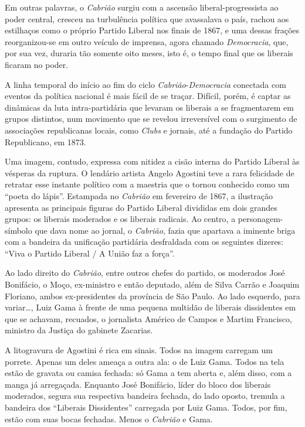 Em outras palavras, o \emph{Cabrião} surgiu com a ascensão
liberal-progressista ao poder central, cresceu na turbulência política
que avassalava o país, rachou aos estilhaços como o próprio Partido
Liberal nos finais de 1867, e uma dessas frações reorganizou-se em outro
veículo de imprensa, agora chamado \emph{Democracia}, que, por sua vez,
duraria tão somente oito meses, isto é, o tempo final que os liberais
ficaram no poder.

A linha temporal do início ao fim do ciclo
\emph{Cabrião}-\emph{Democracia} conectada com eventos da política
nacional é mais fácil de se traçar. Difícil, porém, é captar as
dinâmicas da luta intra-partidária que levaram os liberais a se
fragmentarem em grupos distintos, num movimento que se revelou
irreversível com o surgimento de associações republicanas locais, como
\emph{Clubs} e jornais, até a fundação do Partido Republicano, em 1873.

Uma imagem, contudo, expressa com nitidez a cisão interna do Partido
Liberal às vésperas da ruptura. O lendário artista Angelo Agostini teve
a rara felicidade de retratar esse instante político com a maestria que
o tornou conhecido como um ``poeta do lápis''. Estampada no \emph{Cabrião}
em fevereiro de 1867, a ilustração apresenta as principais figuras do
Partido Liberal divididas em dois grandes grupos: os liberais moderados
e os liberais radicais. Ao centro, a personagem-símbolo que dava nome ao
jornal, o \emph{Cabrião}, fazia que apartava a iminente briga com a
bandeira da unificação partidária desfraldada com os seguintes dizeres:
``Viva o Partido Liberal / A União faz a força''.

Ao lado direito do \emph{Cabrião}, entre outros chefes do partido, os
moderados José Bonifácio, o Moço, ex-ministro e então deputado, além de
Silva Carrão e Joaquim Floriano, ambos ex-presidentes da província de
São Paulo. Ao lado esquerdo, para variar\ldots{}, Luiz Gama à frente de uma
pequena multidão de liberais dissidentes em que se achavam, recuados, o
jornalista Américo de Campos e Martim Francisco, ministro da Justiça do
gabinete Zacarias.

A litogravura de Agostini é rica em sinais. Todos na imagem carregam um
porrete. Apenas um deles ameaça a outra ala: o de Luiz Gama. Todos na
tela estão de gravata ou camisa fechada: só Gama a tem aberta e, além
disso, com a manga já arregaçada. Enquanto José Bonifácio, líder do
bloco dos liberais moderados, segura sua respectiva bandeira fechada, do
lado oposto, tremula a bandeira dos ``Liberais Dissidentes'' carregada por
Luiz Gama. Todos, por fim, estão com suas bocas fechadas. Menos o
\emph{Cabrião} e Gama.

